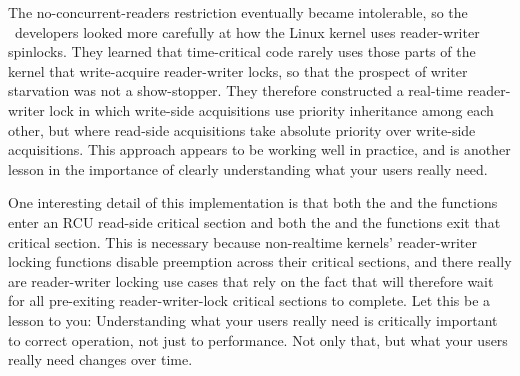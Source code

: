 \QuickQuizEnd

The no-concurrent-readers restriction eventually became intolerable, so
the \rt\ developers looked more carefully at how the Linux kernel uses
reader-writer spinlocks.
They learned that time-critical code rarely uses those parts of the
kernel that write-acquire reader-writer locks, so that the prospect
of writer starvation was not a show-stopper.
They therefore constructed a real-time reader-writer lock in which
write-side acquisitions use priority inheritance among each other,
but where read-side acquisitions take absolute priority over
write-side acquisitions.
This approach appears to be working well in practice, and is another
lesson in the importance of clearly understanding what your users
really need.

One interesting detail of this implementation is that both the
 and the  functions enter an RCU
read-side critical section and both the  and the
 functions exit that critical section.
This is necessary because non-realtime kernels' reader-writer locking
functions disable preemption across their critical sections, and
there really are reader-writer locking use cases that rely on the fact
that  will therefore wait for all pre-exiting
reader-writer-lock critical sections to complete.
Let this be a lesson to you:
Understanding what your users really need is critically important to
correct operation, not just to performance.
Not only that, but what your users really need changes over time.

